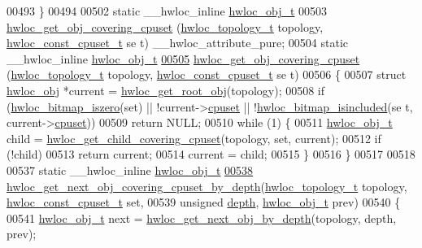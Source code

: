 \begin{DoxyCode}
00493 \}
00494 
00502 \textcolor{keyword}{static} \_\_hwloc\_inline \hyperlink{a00016}{hwloc_obj_t}
00503 \hyperlink{a00055_ga68300dd0ee9c36a7a90f275a59e9af28}{hwloc_get_obj_covering_cpuset} (\hyperlink{a00039_ga9d1e76ee15a7dee158b786c30b6a6e38}{hwloc_topology_t} topology, \hyperlink{a00040_ga1f784433e9b606261f62d1134f6a3b25}{hwloc_const_cpuset_t} \textcolor{keyword}{se
      t}) \_\_hwloc\_attribute\_pure;
00504 static \_\_hwloc\_inline \hyperlink{a00016}{hwloc_obj_t}
\hypertarget{a00031_source_l00505}{}\hyperlink{a00055_ga68300dd0ee9c36a7a90f275a59e9af28}{00505} \hyperlink{a00055_ga68300dd0ee9c36a7a90f275a59e9af28}{hwloc_get_obj_covering_cpuset} (\hyperlink{a00039_ga9d1e76ee15a7dee158b786c30b6a6e38}{hwloc_topology_t} topology, \hyperlink{a00040_ga1f784433e9b606261f62d1134f6a3b25}{hwloc_const_cpuset_t} se
      t)
00506 \{
00507   \textcolor{keyword}{struct }\hyperlink{a00016}{hwloc_obj} *current = \hyperlink{a00053_gadbf58f6e187efbdb3cd9a8e30311b7d7}{hwloc_get_root_obj}(topology);
00508   \textcolor{keywordflow}{if} (\hyperlink{a00065_gaa94fed35d2a598bc4a8657b6955b7bf5}{hwloc_bitmap_iszero}(\textcolor{keyword}{set}) || !current->\hyperlink{a00016_a67925e0f2c47f50408fbdb9bddd0790f}{cpuset} || !\hyperlink{a00065_gaae29e14a926c198e8f91e6e4790621e7}{hwloc_bitmap_isincluded}(\textcolor{keyword}{se
      t}, current->\hyperlink{a00016_a67925e0f2c47f50408fbdb9bddd0790f}{cpuset}))
00509     \textcolor{keywordflow}{return} NULL;
00510   \textcolor{keywordflow}{while} (1) \{
00511     \hyperlink{a00016}{hwloc_obj_t} child = \hyperlink{a00055_ga69a22cc76c88115aee7b7e6fc53fca7d}{hwloc_get_child_covering_cpuset}(topology, \textcolor{keyword}{set}, current);
00512     \textcolor{keywordflow}{if} (!child)
00513       \textcolor{keywordflow}{return} current;
00514     current = child;
00515   \}
00516 \}
00517 
00518 
00537 \textcolor{keyword}{static} \_\_hwloc\_inline \hyperlink{a00016}{hwloc_obj_t}
\hypertarget{a00031_source_l00538}{}\hyperlink{a00056_ga2f9a4ec15e9cfae8c21501257a51ce5b}{00538} \hyperlink{a00056_ga2f9a4ec15e9cfae8c21501257a51ce5b}{hwloc_get_next_obj_covering_cpuset_by_depth}(\hyperlink{a00039_ga9d1e76ee15a7dee158b786c30b6a6e38}{hwloc_topology_t} topology, 
      \hyperlink{a00040_ga1f784433e9b606261f62d1134f6a3b25}{hwloc_const_cpuset_t} \textcolor{keyword}{set},
00539                                             \textcolor{keywordtype}{unsigned} \hyperlink{a00016_a9d82690370275d42d652eccdea5d3ee5}{depth}, \hyperlink{a00016}{hwloc_obj_t} prev)
00540 \{
00541   \hyperlink{a00016}{hwloc_obj_t} next = \hyperlink{a00053_gab7c1dce3f42ece5bfa621e87cf332418}{hwloc_get_next_obj_by_depth}(topology, depth, prev);

\end{DoxyCode}
